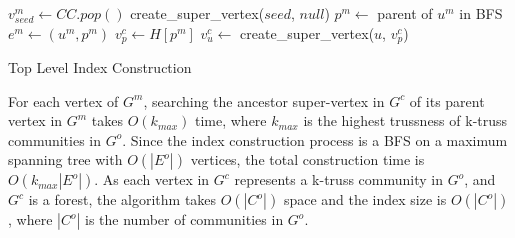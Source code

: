 \begin{algorithm}
	\BlankLine
	 {
		$v^{m}_{seed} \gets CC.pop()$\;
		create\_super\_vertex($seed$, $null$)\;
		 {
			$p^m \gets$ parent of $u^m$ in BFS\;
			$e^m \gets (u^m, p^m)$\;
			$v^{c}_{p} \gets H[p^m]$ 
			\lWhile{$\tau_{v^{c}_{p}} > \tau_{e^m}$}{
					${v^{c}_{p}}^{\prime} \gets v^{c}_{p}$, $v^{c}_{p} \gets v^{c}_{p}.parent$
			}
			 {
				 {
					$v^{c}_{u} \gets$ create\_super\_vertex($u$, $v^{c}_{p}$)\;
				}
			}
		}
	}
	\caption{Top Level Index Construction}
	\label{alg:\treeindex{}_construction}
\end{algorithm}

For each vertex of $G^m$, searching the ancestor super-vertex in $G^c$ of its parent vertex in $G^m$ takes $O(k_{max})$ time, where $k_{max}$ is the highest trussness of k-truss communities in $G^o$. Since the index construction process is a BFS on a maximum spanning tree with $O(|E^o|)$ vertices, the total construction time is $O(k_{max}|E^o|)$. As each vertex in $G^c$ represents a k-truss community in $G^o$, and $G^c$ is a forest, the algorithm takes $O(|C^o|)$ space and the index size is $O(|C^o|)$, where $|C^o|$ is the number of communities in $G^o$. 
%
%
